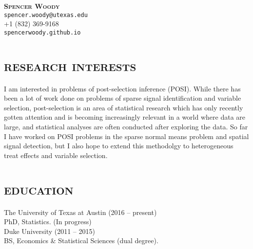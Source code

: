\documentclass{article}
\begin{document}
\begin{center}
	\Large{\textbf{\textsc{Spencer Woody}}} \\
	\normalsize{\texttt{spencer.woody@utexas.edu}}\\
	+1 (832) 369-9168\\
	\texttt{spencerwoody.github.io}
\end{center}



\section{\textbf{\textsc{research interests}}}

I am interested in problems of post-selection inference (POSI). While
there has been a lot of work done on problems of sparse signal
identification and variable selection, post-selection is an area of
statistical research which has only recently gotten attention and is
becoming increasingly relevant in a world where data are large, and
statistical analyses are often conducted after exploring the data. So
far I have worked on POSI problems in the sparse normal means problem
and spatial signal detection, but I also hope to extend this
methodolgy to heterogeneous treat effects and variable selection. 

\section{\textbf{\textsc{education}}}
The University of Texas at Austin (2016 -- present)\\
PhD, Statistics. (In progress) \\ 

Duke University (2011 -- 2015) \\
BS, Economics \& Statistical Sciences (dual degree). \\
 
\end{document}
